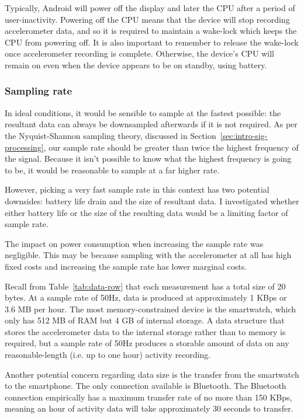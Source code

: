         Typically, Android will power off the display and later the CPU after a period of user-inactivity. Powering off the CPU means that the device will stop recording accelerometer data, and so it is required to maintain a wake-lock which keeps the CPU from powering off. It is also important to remember to release the wake-lock once accelerometer recording is complete. Otherwise, the device's CPU will remain on even when the device appears to be on standby, using battery.
        
      \subsubsection{Sampling rate}
        In ideal conditions, it would be sensible to sample at the fastest possible: the resultant data can always be downsampled afterwards if it is not required. As per the Nyquist-Shannon sampling theory, discussed in Section~\ref{sec:intro-sig-processing}, our sample rate should be greater than twice the highest frequency of the signal. Because it isn't possible to know what the highest frequency is going to be, it would be reasonable to sample at a far higher rate. 
        
        However, picking a very fast sample rate in this context has two potential downsides: battery life drain and the size of resultant data. I investigated whether either battery life or the size of the resulting data would be a limiting factor of sample rate.
        
        The impact on power consumption when increasing the sample rate was negligible. This may be because sampling with the accelerometer at all has high fixed costs and increasing the sample rate has lower marginal costs.
      
        Recall from Table~\ref{tab:data-row} that each measurement has a total size of 20 bytes. At a sample rate of 50\si{Hz}, data is produced at approximately 1 KBps or 3.6 MB per hour. The most memory-constrained device is the smartwatch, which only has 512 MB of RAM but 4 GB of internal storage. A data structure that stores the accelerometer data to the internal storage rather than to memory is required, but a sample rate of 50\si{Hz} produces a storable amount of data on any reasonable-length (i.e. up to one hour) activity recording.
        
        Another potential concern regarding data size is the transfer from the smartwatch to the smartphone. The only connection available is Bluetooth. The Bluetooth connection empirically has a maximum transfer rate of no more than 150 KBps, meaning an hour of activity data will take approximately 30 seconds to transfer.

